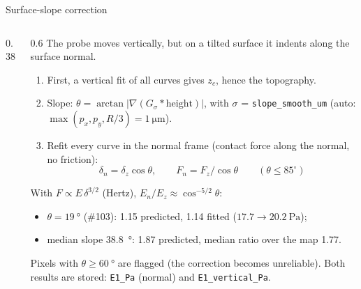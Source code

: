 \documentclass[aspectratio=169,9pt]{beamer}
\begin{document}
\begin{frame}{Surface-slope correction}
\begin{columns}[T]
\begin{column}{0.38\textwidth}
\centering
{}
\end{column}
\begin{column}{0.6\textwidth}\small
The probe moves vertically, but on a tilted surface it indents along the surface normal.
\begin{enumerate}
\item First, a vertical fit of all curves gives $z_c$, hence the topography.
\item Slope: $\theta=\arctan|\nabla(G_\sigma*\text{height})|$, with $\sigma$ = \texttt{slope\_smooth\_um} (auto: $\max(p_x,p_y,R/3)=\SI{1}{\micro\metre}$).
\item Refit every curve in the normal frame (contact force along the normal, no friction):
\[\delta_n=\delta_z\cos\theta,\qquad F_n=F_z/\cos\theta\qquad(\theta\le85^\circ)\]
\end{enumerate}
With $F\propto E\,\delta^{3/2}$ (Hertz), $E_n/E_z\approx\cos^{-5/2}\theta$:
\begin{itemize}
\item $\theta=\SI{19}{\degree}$ (\#103): 1.15 predicted, 1.14 fitted ($17.7\to\SI{20.2}{\pascal}$);
\item median slope \SI{38.8}{\degree}: 1.87 predicted, median ratio over the map 1.77.
\end{itemize}
Pixels with $\theta\ge\SI{60}{\degree}$ are flagged (the correction becomes unreliable). Both results are stored: \texttt{E1\_Pa} (normal) and \texttt{E1\_vertical\_Pa}.
\end{column}
\end{columns}
\end{frame}

\end{document}

